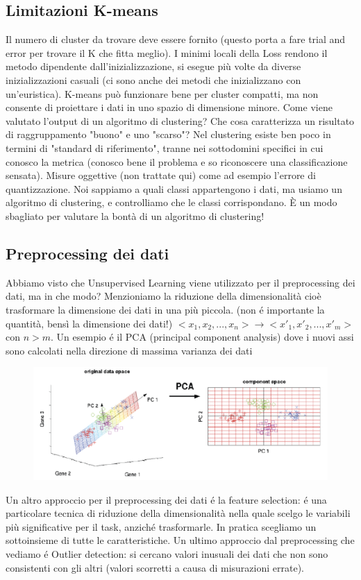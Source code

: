 \documentclass{article}
\begin{document}
\subsection{Limitazioni K-means}
Il numero di cluster da trovare deve essere fornito (questo porta a fare trial and error per trovare il K che fitta meglio). I minimi locali della Loss rendono il metodo dipendente dall'inizializzazione, si esegue più volte da diverse inizializzazioni casuali (ci sono anche dei metodi che inizializzano con un'euristica). K-means può funzionare bene per cluster compatti, ma non consente di proiettare i dati in uno spazio di dimensione minore. \newline
Come viene valutato l'output di un algoritmo di clustering? Che cosa caratterizza un risultato di raggruppamento "buono" e uno "scarso"? Nel clustering esiste ben poco in termini di "standard di riferimento", tranne nei sottodomini specifici in cui conosco la metrica (conosco bene il problema e so riconoscere una classificazione sensata). Misure oggettive (non trattate qui) come ad esempio l'errore di quantizzazione. Noi sappiamo a quali classi appartengono i dati, ma usiamo un algoritmo di clustering, e controlliamo che le classi corrispondano. È un modo sbagliato per valutare la bontà di un algoritmo di clustering!

\subsection{Preprocessing dei dati}
Abbiamo visto che Unsupervised Learning viene utilizzato per il preprocessing dei dati, ma in che modo?
Menzioniamo la riduzione della dimensionalità cioè trasformare la dimensione dei dati in una più piccola. (non é importante la quantità, bensì la dimensione dei dati!) \newline
$<x_1, x_2, ..., x_n> \rightarrow <x'_1, x'_2, ..., x'_m>$ con $n>m$. \newline
Un esempio é il PCA (principal component analysis) dove i nuovi assi sono calcolati nella direzione di massima varianza dei dati 
\begin{figure}[H]
\centering
\includegraphics[scale=0.4]{Images/PCA.png}
\end{figure}
Un altro approccio per il preprocessing dei dati é la feature selection: é una particolare tecnica di riduzione della dimensionalità nella quale scelgo le variabili più significative per il task, anziché trasformarle. In pratica scegliamo un sottoinsieme di tutte le caratteristiche. Un ultimo approccio dal preprocessing che vediamo é Outlier detection: si cercano valori inusuali dei dati che non sono consistenti con gli altri (valori scorretti a causa di misurazioni errate).
\end{document}
